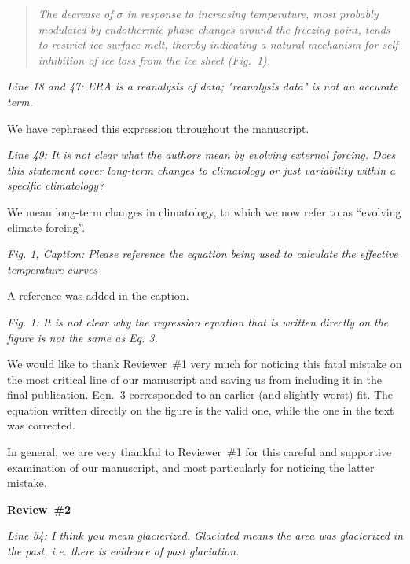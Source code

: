 \documentclass[10pt]{article}
\def\referee#1{\bigskip\textcolor{blue!50!black}{\textit{#1}}}
\def\msquote#1{\begin{quote}\textit{#1}\end{quote}}
\begin{document}
\msquote{The decrease of $\sigma$ in response to increasing temperature, most probably modulated by endothermic phase changes around the freezing point, tends to restrict ice surface melt, thereby indicating a natural mechanism for self-inhibition of ice loss from the ice sheet (Fig.~1).}

\referee{Line 18 and 47: ERA is a reanalysis of data; "reanalysis data" is not an accurate term.}

We have rephrased this expression throughout the manuscript.

\referee{Line 49: It is not clear what the authors mean by evolving external forcing. Does this statement cover long-term changes to climatology or just variability within a specific climatology?}

We mean long-term changes in climatology, to which we now refer to as ``evolving climate forcing''. 

\referee{Fig. 1, Caption: Please reference the equation being used to calculate the effective temperature curves}

A reference was added in the caption.

\referee{Fig. 1: It is not clear why the regression equation that is written directly on the figure is not the same as Eq. 3.}

We would like to thank Reviewer~{\#}1 very much for noticing this fatal mistake on the most critical line of our manuscript and saving us from including it in the final publication. Eqn.~3 corresponded to an earlier (and slightly worst) fit. The equation written directly on the figure is the valid one, while the one in the text was corrected.

In general, we are very thankful to Reviewer~{\#}1 for this careful and supportive examination of our manuscript, and most particularly for noticing the latter mistake.


\bigskip
\textbf{Review~{\#}2}



\referee{Line 54: I think you mean glacierized. Glaciated means the area was glacierized in the past, i.e. there is evidence of past glaciation.}
\end{document}

